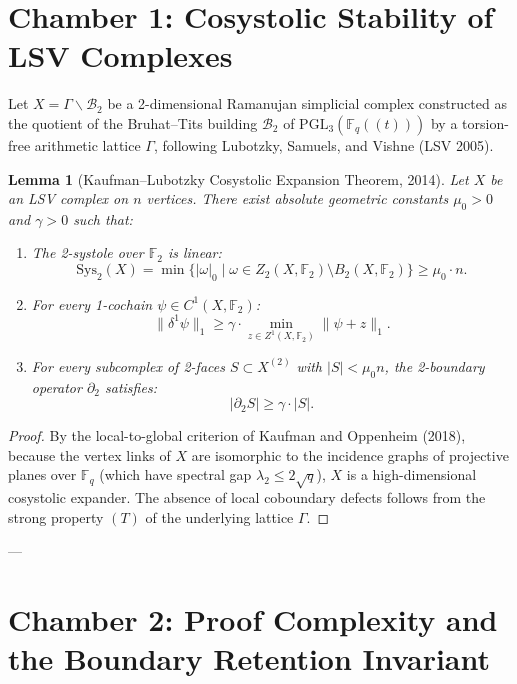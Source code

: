 \documentclass[11pt,a4paper]{article}
\theoremstyle{plain}
\newtheorem{lemma}[theorem]{Lemma}
\theoremstyle{definition}
\theoremstyle{remark}
\begin{document}
\tableofcontents
\newpage

\section{Chamber 1: Cosystolic Stability of LSV Complexes}

Let $X = \Gamma \backslash \mathcal{B}_2$ be a 2-dimensional Ramanujan simplicial complex constructed as the quotient of the Bruhat--Tits building $\mathcal{B}_2$ of $\mathrm{PGL}_3(\mathbb{F}_q((t)))$ by a torsion-free arithmetic lattice $\Gamma$, following Lubotzky, Samuels, and Vishne (LSV 2005).

\begin{lemma}[Kaufman--Lubotzky Cosystolic Expansion Theorem, 2014]\label{lem:cosystolic}
Let $X$ be an LSV complex on $n$ vertices. There exist absolute geometric constants $\mu_0 > 0$ and $\gamma > 0$ such that:
\begin{enumerate}
    \item The 2-systole over $\mathbb{F}_2$ is linear:
    \[
    \mathrm{Sys}_2(X) = \min \{ |\omega|_0 \mid \omega \in Z_2(X, \mathbb{F}_2) \setminus B_2(X, \mathbb{F}_2) \} \ge \mu_0 \cdot n.
    \]
    \item For every 1-cochain $\psi \in C^1(X, \mathbb{F}_2)$:
    \[
    \|\delta^1 \psi\|_1 \ge \gamma \cdot \min_{z \in Z^1(X, \mathbb{F}_2)} \|\psi + z\|_1.
    \]
    \item For every subcomplex of 2-faces $S \subset X^{(2)}$ with $|S| < \mu_0 n$, the 2-boundary operator $\partial_2$ satisfies:
    \[
    |\partial_2 S| \ge \gamma \cdot |S|.
    \]
\end{enumerate}
\end{lemma}

\begin{proof}
By the local-to-global criterion of Kaufman and Oppenheim (2018), because the vertex links of $X$ are isomorphic to the incidence graphs of projective planes over $\mathbb{F}_q$ (which have spectral gap $\lambda_2 \le 2\sqrt{q}$), $X$ is a high-dimensional cosystolic expander. The absence of local coboundary defects follows from the strong property $(T)$ of the underlying lattice $\Gamma$.
\end{proof}

---

\section{Chamber 2: Proof Complexity and the Boundary Retention Invariant}
\end{document}

